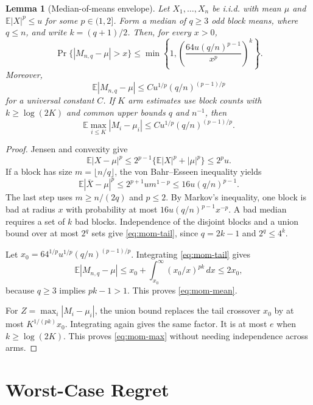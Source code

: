 \documentclass[twoside]{article}
\newtheorem{lemma}[theorem]{Lemma}
\newcommand{\E}{\mathbb E}
\begin{document}
\begin{lemma}[Median-of-means envelope]
\label{lem:mom}
Let $X_1,\ldots,X_n$ be i.i.d. with mean $\mu$ and
$\E|X|^p\leq u$ for some $p\in(1,2]$. Form a median of $q\geq3$ odd block
means, where $q\leq n$, and write $k=(q+1)/2$. Then, for every $x>0$,
\begin{equation}
 \Pr\{|M_{n,q}-\mu|>x\}
 \leq \min\left\{1,
 \left(\frac{64u(q/n)^{p-1}}{x^p}\right)^k\right\}.
 \label{eq:mom-tail}
\end{equation}
Moreover,
\begin{equation}
 \E|M_{n,q}-\mu|
 \leq C u^{1/p}(q/n)^{(p-1)/p}
 \label{eq:mom-mean}
\end{equation}
for a universal constant $C$.
If $K$ arm estimates use block counts with
$k\geq\log(2K)$ and common upper bounds $q$ and $n^{-1}$, then
\begin{equation}
 \E\max_{i\leq K}|M_i-\mu_i|
 \leq C u^{1/p}(q/n)^{(p-1)/p}.
 \label{eq:mom-max}
\end{equation}
\end{lemma}

\begin{proof}
Jensen and convexity give
\[
 \E|X-\mu|^p
 \leq2^{p-1}\{\E|X|^p+|\mu|^p\}\leq2^pu.
\]
If a block has size $m=\lfloor n/q\rfloor$, the von Bahr--Esseen
inequality \citep{vonbahr1965inequalities} yields
\[
 \E|\bar X-\mu|^p
 \leq2^{p+1}um^{1-p}
 \leq16u(q/n)^{p-1}.
\]
The last step uses $m\geq n/(2q)$ and $p\leq2$. By Markov's inequality, one
block is bad at radius $x$ with probability at most
$16u(q/n)^{p-1}x^{-p}$. A bad median requires a set of $k$ bad blocks.
Independence of the disjoint blocks and a union bound over at most $2^q$
sets give \eqref{eq:mom-tail}, since $q=2k-1$ and $2^q\leq4^k$.

Let $x_0=64^{1/p}u^{1/p}(q/n)^{(p-1)/p}$. Integrating
\eqref{eq:mom-tail} gives
\[
 \E|M_{n,q}-\mu|
 \leq x_0+\int_{x_0}^\infty(x_0/x)^{pk}\,dx
 \leq2x_0,
\]
because $q\geq3$ implies $pk-1>1$. This proves
\eqref{eq:mom-mean}.

For $Z=\max_i|M_i-\mu_i|$, the union bound replaces the tail crossover
$x_0$ by at most $K^{1/(pk)}x_0$. Integrating again gives the same factor.
It is at most $e$ when $k\geq\log(2K)$. This proves
\eqref{eq:mom-max} without needing independence across arms.
\end{proof}

\section{Worst-Case Regret}
\label{sec:free}
\end{document}
